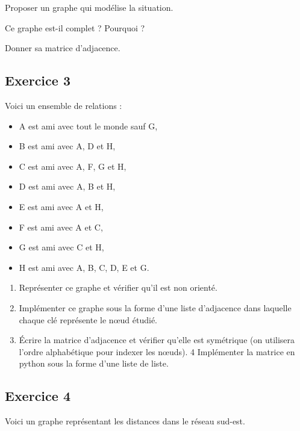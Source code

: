 \documentclass[
  letterpaper,
  DIV=11,
  numbers=noendperiod]{scrartcl}
\providecommand{\tightlist}{%
  \setlength{\itemsep}{0pt}\setlength{\parskip}{0pt}}\usepackage{longtable,booktabs,array}
\begin{document}
Proposer un graphe qui modélise la situation.

Ce graphe est-il complet ? Pourquoi ?

Donner sa matrice d'adjacence.

\hypertarget{exercice-3}{%
\subsection{\texorpdfstring{ Exercice
3}{ Exercice 3}}\label{exercice-3}}

Voici un ensemble de relations :

\begin{itemize}
\tightlist
\item
  A est ami avec tout le monde sauf G,
\item
  B est ami avec A, D et H,
\item
  C est ami avec A, F, G et H,
\item
  D est ami avec A, B et H,
\item
  E est ami avec A et H,
\item
  F est ami avec A et C,
\item
  G est ami avec C et H,
\item
  H est ami avec A, B, C, D, E et G.
\end{itemize}

\begin{enumerate}
\def\labelenumi{\arabic{enumi}.}
\tightlist
\item
  Représenter ce graphe et vérifier qu'il est non orienté.
\item
  Implémenter ce graphe sous la forme d'une liste d'adjacence dans
  laquelle chaque clé représente le nœud étudié.
\item
  Écrire la matrice d'adjacence et vérifier qu'elle est symétrique (on
  utilisera l'ordre alphabétique pour indexer les nœuds). 4 Implémenter
  la matrice en python sous la forme d'une liste de liste.
\end{enumerate}

\hypertarget{exercice-4}{%
\subsection{\texorpdfstring{ Exercice
4}{ Exercice 4}}\label{exercice-4}}

Voici un graphe représentant les distances dans le réseau sud-est.
\end{document}
